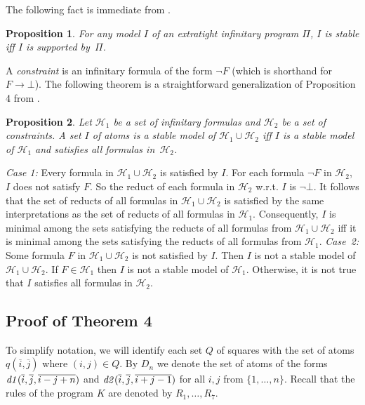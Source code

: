 \documentclass{tlp_mod}
\def\o{\overline}
\def\rar{\rightarrow}
\def\i#1{\hbox{\it #1\/}}
\newtheorem{proposition}{Proposition}
\begin{document}
The following fact is immediate from \cite[Lemma 2]{lif13a}. 

\begin{proposition}\label{thm:etight}
For any model $I$ of an extratight infinitary program $\Pi$, $I$ is 
stable iff $I$ is supported by~$\Pi$.
\end{proposition}

A {\sl constraint} is an infinitary formula of the form $\neg F$
(which is shorthand for $F\rar\bot$). The 
following theorem is a straightforward generalization of 
Proposition 4  from \cite{fer05e}. 

\begin{proposition}\label{thm:cons}
Let $\mathcal{H}_1$  be a set of infinitary formulas and $\mathcal{H}_2$ be
a set of constraints. A set $I$ of 
atoms  is a stable model of $\mathcal{H}_1 \cup \mathcal{H}_2$ iff $I$ is a 
stable model of $\mathcal{H}_1$ and satisfies all formulas in~$\mathcal{H}_2$.
\end{proposition}

\begin{proof*}
{\em Case 1:} Every formula in $\mathcal{H}_1 \cup \mathcal{H}_2$ is satisfied 
by $I$. For each formula $\neg F$ in $\mathcal{H}_2$, $I$ does not satisfy $F$.
So the reduct of each formula in $\mathcal{H}_2$ w.r.t. $I$ is $\neg \bot$. 
It follows that the set of reducts of all formulas in 
$\mathcal{H}_1 \cup \mathcal{H}_2$ 
is satisfied by the same interpretations as the set of reducts of all
formulas in $\mathcal{H}_1$.  Consequently, $I$ is minimal among the sets 
satisfying the reducts of all formulas from 
$\mathcal{H}_1 \cup \mathcal{H}_2$ iff it is minimal among the sets 
satisfying the reducts of all formulas from $\mathcal{H}_1$. {\em Case~2: } 
Some formula $F$ in $\mathcal{H}_1 \cup \mathcal{H}_2$ is not satisfied by $I$.
Then $I$ is not a stable model of $\mathcal{H}_1 \cup \mathcal{H}_2$.  
If $F \in \mathcal{H}_1$ then $I$ is not a stable model of $\mathcal{H}_1$.  
Otherwise, it is not true that $I$ satisfies all formulas in $\mathcal{H}_2$. 
\end{proof*}

\subsection*{Proof of Theorem 4}

To simplify notation, we will identify each set $Q$ of squares with the set of 
atoms $q(\o i, \o j)$ where \hbox{$(i, j) \in Q$}. By $D_n$ we denote the set 
of atoms of the forms $\i{d1}(\o i, \o j, \o{i-j+n})$ and $\i{d2}(\o i, \o j, 
\o{i+j-1})$ for all $i,j$ from $\{1,\dots,n\}$. Recall that the rules
of the program $K$ are denoted by $R_1,\dots,R_7$. 
\end{document}
